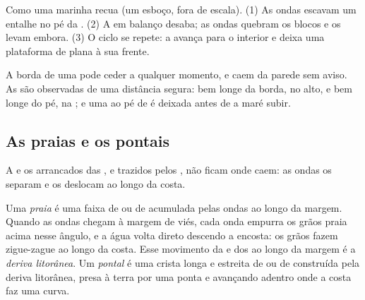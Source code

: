 \begin{omfigure}
{\small Como uma  marinha recua (um esboço, fora de escala). (1) As
ondas escavam um entalhe no pé da . (2) A  em balanço desaba;
as ondas quebram os blocos e os levam embora. (3) O ciclo se repete: a
 avança para o interior e deixa uma plataforma de  plana à
sua frente.}
\label{fig:g9:landforms:cliff-retreat}
\end{omfigure}

\begin{safety}
A borda de uma  pode ceder a qualquer momento, e  caem da
parede sem aviso. As  são observadas de uma distância segura:
bem longe da borda, no alto, e bem longe do pé, na ; e uma  ao
pé de  é deixada antes de a maré subir.
\end{safety}

\subsection{As praias e os pontais}

A  e os  arrancados das , e trazidos pelos , não
ficam onde caem: as ondas os separam e os deslocam ao longo da costa.

\begin{definition}\label{def:g9:landforms:beach}
Uma \emph{praia} é uma faixa de  ou de  acumulada
pelas ondas ao longo da margem. Quando as ondas chegam à margem de
viés, cada onda empurra os grãos praia acima nesse ângulo, e a água volta
direto descendo a encosta: os grãos fazem zigue-zague ao longo da costa.
Esse movimento da  e dos  ao longo da margem é a \emph{deriva
litorânea}. Um
\emph{pontal} é uma crista longa e estreita de  ou de
 construída pela deriva litorânea, presa à terra por uma ponta e
avançando  adentro onde a costa faz uma curva.
\end{definition}

